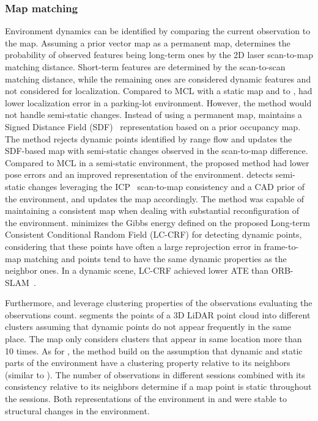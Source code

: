 \subsubsection{Map matching}

Environment dynamics can be identified by comparing the current observation to the map.
Assuming a prior vector map as a permanent map, \cite{biswas-veloso:2017:005} determines the probability of observed features being long-term ones by the 2D laser scan-to-map matching distance. Short-term features are determined by the scan-to-scan matching distance, while the remaining ones are considered dynamic features and not considered for localization. Compared to MCL with a static map and to \cite{tipaldi-et-al:2013:0278364913502830}, \cite{biswas-veloso:2017:005} had lower localization error in a parking-lot environment. However, the method would not handle semi-static changes.
Instead of using a permanent map, \cite{zhang-et-al:2019:8814347} maintains a Signed Distance Field (SDF)~\parencite{original:sdf} representation based on a prior occupancy map. The method rejects dynamic points identified by range flow and updates the SDF-based map with semi-static changes observed in the scan-to-map difference. Compared to MCL in a semi-static environment, the proposed method had lower pose errors and an improved representation of the environment.
\cite{boniardi-et-al:2019:003} detects semi-static changes leveraging the ICP~\parencite{original:icp} scan-to-map consistency and a CAD prior of the environment, and updates the map accordingly. The method was capable of maintaining a consistent map when dealing with substantial reconfiguration of the environment.
\cite{du-et-al:2022:3028218} minimizes the Gibbs energy defined on the proposed Long-term Consistent Conditional Random Field (LC-CRF) for detecting dynamic points, considering that these points have often a large reprojection error in frame-to-map matching and points tend to have the same dynamic properties as the neighbor ones. In a dynamic scene, LC-CRF achieved lower ATE than ORB-SLAM~\parencite{mur-artal-et-al:2015:2463671}.

Furthermore, \cite{pan-et-al:2019:s19194252} and \cite{ding-et-al:2020:2942760} leverage clustering properties of the observations evaluating the observations count.
\cite{pan-et-al:2019:s19194252} segments the points of a 3D LiDAR point cloud into different clusters assuming that dynamic points do not appear frequently in the same place. The map only considers clusters that appear in same location more than 10 times.
As for \cite{ding-et-al:2020:2942760}, the method build on the assumption that dynamic and static parts of the environment have a clustering property relative to its neighbors (similar to \cite{du-et-al:2022:3028218}). The number of observations in different sessions combined with its consistency relative to its neighbors determine if a map point is static throughout the sessions.
Both representations of the environment in \cite{pan-et-al:2019:s19194252} and \cite{ding-et-al:2020:2942760} were stable to structural changes in the environment.

